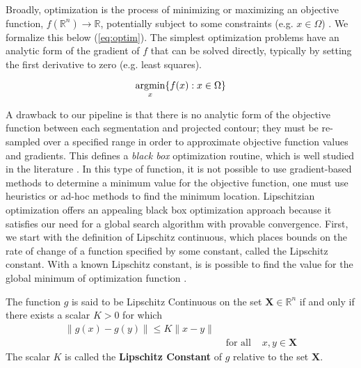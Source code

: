 Broadly, optimization is the process of minimizing or maximizing an objective function, $f(\mathbb{R}^{n}) \rightarrow \mathbb{R}$, potentially subject to some constraints (e.g. $x \in \Omega$) \cite{audetDerivativeFreeBlackboxOptimization2017}. We formalize this below (\cref{eq:optim}). The simplest optimization problems have an analytic form of the gradient of $f$ that can be solved directly, typically by setting the first derivative to zero (e.g. least squares).

\begin{equation}
    \operatorname*{\arg\!min}_{x}\{f(x) : x \in \Omega\}
    \label{eq:optim}
\end{equation}

A drawback to our pipeline is that there is no analytic form of the objective function between each segmentation and projected contour; they must be re-sampled over a specified range in order to approximate objective function values and gradients. This defines a \emph{black box} optimization routine, which is well studied in the literature \cite{audetDerivativeFreeBlackboxOptimization2017}. In this type of function, it is not possible to use gradient-based methods to determine a minimum value for the objective function, one must use heuristics or ad-hoc methods to find the minimum location. Lipschitzian optimization offers an appealing black box optimization approach because it satisfies our need for a global search algorithm with provable convergence. First, we start with the definition of Lipschitz continuous, which places bounds on the rate of change of a function specified by some constant, called the Lipschitz constant. With a known Lipschitz constant, is is possible to find the value for the global minimum of optimization function \cite{dreisigmeyerDIRECTSEARCHMETHODS2007}.

\begin{mdframed}
    \begin{definition}
        The function $g$ is said to be Lipschitz Continuous on the set $\mathbf{X} \in \mathbb{R}^n$ if and only if there exists a scalar $K > 0$ for which
        \begin{equation*}
            \begin{aligned}
                \|g(x) - g(y)\| \le K\|x - y\|  & \\
                &\text{  for all  }& x,y \in \mathbf{X}
            \end{aligned}
        \end{equation*}
        The scalar $K$ is called the {\bf Lipschitz Constant} of $g$ relative to the set $\mathbf{X}$.
    \end{definition}
\end{mdframed}

